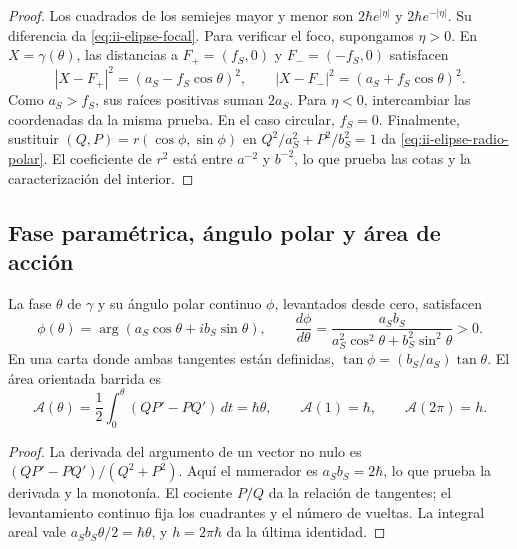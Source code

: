 \begin{proof}
Los cuadrados de los semiejes mayor y menor son
\(2\hbar e^{|\eta|}\) y \(2\hbar e^{-|\eta|}\). Su diferencia
da \eqref{eq:ii-elipse-focal}. Para verificar el foco, supongamos
\(\eta>0\). En \(X=\gamma(\theta)\), las distancias a
\(F_+=(f_S,0)\) y \(F_-=(-f_S,0)\) satisfacen
\[
 |X-F_+|^2=(a_S-f_S\cos\theta)^2,\qquad
 |X-F_-|^2=(a_S+f_S\cos\theta)^2.
\]
Como \(a_S>f_S\), sus raíces positivas suman \(2a_S\).
Para \(\eta<0\), intercambiar las coordenadas da la misma prueba.
En el caso circular, \(f_S=0\). Finalmente, sustituir
\((Q,P)=r(\cos\phi,\sin\phi)\) en
\(Q^2/a_S^2+P^2/b_S^2=1\) da
\eqref{eq:ii-elipse-radio-polar}. El coeficiente de \(r^2\) está
entre \(a^{-2}\) y \(b^{-2}\), lo que prueba las cotas y la
caracterización del interior.
\end{proof}

\subsection{Fase paramétrica, ángulo polar y área de acción}
\label{sec:ii-elipse-fase-area}

\begin{proposition}
\label{prop:ii-elipse-area}
La fase \(\theta\) de \(\gamma\) y su ángulo polar continuo
\(\phi\), levantados desde cero, satisfacen
\begin{equation}
 \phi(\theta)=\arg(a_S\cos\theta+i b_S\sin\theta),\qquad
 \frac{d\phi}{d\theta}
 =\frac{a_Sb_S}{a_S^2\cos^2\theta+b_S^2\sin^2\theta}>0.
 \label{eq:ii-elipse-fases}
\end{equation}
En una carta donde ambas tangentes están definidas,
\(\tan\phi=(b_S/a_S)\tan\theta\). El área orientada barrida es
\begin{equation}
 \mathcal A(\theta)=\frac12\int_0^\theta(QP'-PQ')\,dt
 =\hbar\theta,\qquad
 \mathcal A(1)=\hbar,\qquad \mathcal A(2\pi)=h.
 \label{eq:ii-elipse-area-fase}
\end{equation}
\end{proposition}

\begin{proof}
La derivada del argumento de un vector no nulo es
\((QP'-PQ')/(Q^2+P^2)\). Aquí el numerador es
\(a_Sb_S=2\hbar\), lo que prueba la derivada y la monotonía.
El cociente \(P/Q\) da la relación de tangentes; el levantamiento
continuo fija los cuadrantes y el número de vueltas. La integral areal
vale \(a_Sb_S\theta/2=\hbar\theta\), y
\(h=2\pi\hbar\) da la última identidad.
\end{proof}

